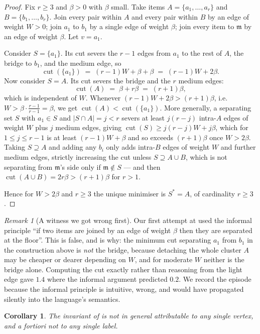 \documentclass[11pt,twocolumn,a4paper]{article}
\theoremstyle{plain}
\newtheorem{corollary}[theorem]{Corollary}
\theoremstyle{definition}
\theoremstyle{remark}
\newtheorem{remark}[theorem]{Remark}
\newcommand{\flo}{\beta}                       %
\newcommand{\med}{\mathfrak{m}}                %
\DeclareMathOperator{\cut}{cut}
\begin{document}
\begin{proof}
Fix $r\ge3$ and $\flo>0$ with $\flo$ small. Take items
$A=\{a_1,\dots,a_r\}$ and $B=\{b_1,\dots,b_r\}$. Join every pair within
$A$ and every pair within $B$ by an edge of weight $W>0$; join $a_1$ to
$b_1$ by a single edge of weight $\flo$; join every item to $\med$ by an
edge of weight $\flo$. Let $v=a_1$.

Consider $S=\{a_1\}$. Its cut severs the $r-1$ edges from $a_1$ to the
rest of $A$, the bridge to $b_1$, and the medium edge, so
\[
  \cut(\{a_1\}) \;=\; (r-1)W + \flo + \flo \;=\; (r-1)W+2\flo .
\]
Now consider $S=A$. Its cut severs the bridge and the $r$ medium edges:
\[
  \cut(A) \;=\; \flo + r\flo \;=\; (r+1)\flo ,
\]
which is independent of $W$. Whenever $(r-1)W+2\flo > (r+1)\flo$, i.e.
$W>\flo\cdot\frac{r-1}{r-1}=\flo$, we get $\cut(A)<\cut(\{a_1\})$.
More generally, a separating set $S$ with $a_1\in S$ and
$|S\cap A|=j<r$ severs at least $j(r-j)$ intra-$A$ edges of weight $W$
plus $j$ medium edges, giving $\cut(S)\ge j(r-j)W+j\flo$, which for
$1\le j\le r-1$ is at least $(r-1)W+\flo$ and so exceeds $(r+1)\flo$
once $W>2\flo$. Taking $S\supseteq A$ and adding any $b_i$ only adds
intra-$B$ edges of weight $W$ and further medium edges, strictly
increasing the cut unless $S\supseteq A\cup B$, which is not separating
from $\med$'s side only if $\med\notin S$ --- and then
$\cut(A\cup B)=2r\flo>(r+1)\flo$ for $r>1$.

Hence for $W>2\flo$ and $r\ge3$ the unique minimiser is $S^\ast=A$, of
cardinality $r\ge3$.
\end{proof}

\begin{remark}[A witness we got wrong first]
\label{rem:badwitness}
Our first attempt at  used the informal principle
``if two items are joined by an edge of weight $\flo$ then they are
separated at the floor''. This is false, and  is why:
the minimum cut separating $a_1$ from $b_1$ in the construction above is
\emph{not} the bridge, because detaching the whole cluster $A$ may be
cheaper or dearer depending on $W$, and for moderate $W$ neither is the
bridge alone. Computing the cut exactly rather than reasoning from the
light edge gave $1.4$ where the informal argument predicted $0.2$. We
record the episode because the informal principle is intuitive, wrong,
and would have propagated silently into the language's semantics.
\end{remark}

\begin{corollary}
\label{cor:notpoint}
The invariant of  is not in general attributable
to any single vertex, and \emph{a fortiori} not to any single label.
\end{corollary}
\end{document}
